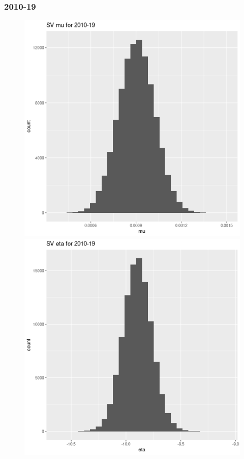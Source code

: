 \documentclass[12pt,letterpaper,reqno,fleqn]{article}
\begin{document}
\subsubsection{2010-19}
\begin{figure}
\includegraphics[scale = .4]{svmu1019}
\includegraphics[scale = .4]{sve1019}

\end{figure}
\end{document}
